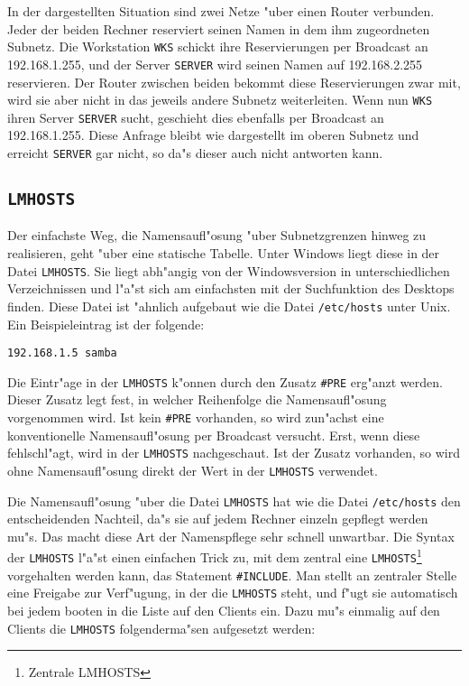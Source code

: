\documentclass{scrartcl}\usepackage{pslatex}\typearea{12}
\newcommand{\dateistyle}{\texttt}
\newcommand{\nbname}{\texttt}
\begin{document}
In der dargestellten Situation sind zwei Netze "uber einen Router
verbunden. Jeder der beiden Rechner reserviert seinen Namen in dem ihm
zugeordneten Subnetz. Die Workstation \nbname{WKS} schickt ihre
Reservierungen per Broadcast an 192.168.1.255, und der Server
\nbname{SERVER} wird seinen Namen auf 192.168.2.255 reservieren. Der
Router zwischen beiden bekommt diese Reservierungen zwar mit, wird sie
aber nicht in das jeweils andere Subnetz weiterleiten. Wenn nun
\nbname{WKS} ihren Server \nbname{SERVER} sucht, geschieht dies
ebenfalls per Broadcast an 192.168.1.255. Diese Anfrage bleibt wie
dargestellt im oberen Subnetz und erreicht \nbname{SERVER} gar nicht,
so da"s dieser auch nicht antworten kann.

\subsection{\nbname{LMHOSTS}}

Der einfachste Weg, die Namensaufl"osung "uber Subnetzgrenzen hinweg
zu realisieren, geht "uber eine statische Tabelle. Unter Windows
liegt diese in der Datei \dateistyle{LMHOSTS}. Sie liegt abh"angig von der
Windowsversion in unterschiedlichen Verzeichnissen und l"a"st sich am
einfachsten mit der Suchfunktion des Desktops finden. Diese Datei ist
"ahnlich aufgebaut wie die Datei \dateistyle{/etc/hosts} unter Unix. Ein
Beispieleintrag ist der folgende:

\verb|192.168.1.5 samba|

Die Eintr"age in der \dateistyle{LMHOSTS} k"onnen durch den Zusatz
\texttt{\#PRE} erg"anzt werden. Dieser Zusatz legt fest, in welcher
Reihenfolge die Namensaufl"osung vorgenommen wird. Ist kein
\texttt{\#PRE} vorhanden, so wird zun"achst eine konventionelle
Namensaufl"osung per Broadcast versucht. Erst, wenn diese
fehlschl"agt, wird in der \dateistyle{LMHOSTS} nachgeschaut. Ist der Zusatz
vorhanden, so wird ohne Namensaufl"osung direkt der Wert in der
\dateistyle{LMHOSTS} verwendet.

Die Namensaufl"osung "uber die Datei \dateistyle{LMHOSTS} hat wie die
Datei \dateistyle{/etc/hosts} den entscheidenden Nachteil, da"s sie
auf jedem Rechner einzeln gepflegt werden mu"s. Das macht diese Art
der Namenspflege sehr schnell unwartbar. Die Syntax der
\dateistyle{LMHOSTS} l"a"st einen einfachen Trick zu, mit dem zentral
eine \dateistyle{LMHOSTS}\footnote{Zentrale LMHOSTS} vorgehalten
werden kann, das Statement \nbname{\#INCLUDE}. Man stellt an zentraler
Stelle eine Freigabe zur Verf"ugung, in der die \dateistyle{LMHOSTS}
steht, und f"ugt sie automatisch bei jedem booten in die Liste auf den
Clients ein.  Dazu mu"s einmalig auf den Clients die
\dateistyle{LMHOSTS} folgenderma"sen aufgesetzt werden:
\end{document}
